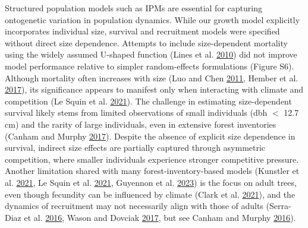 \documentclass[12pt]{article}
\begin{document}
Structured population models such as IPMs are essential for capturing
ontogenetic variation in population dynamics. While our growth model
explicitly incorporates individual size, survival and recruitment models
were specified without direct size dependence. Attempts to include
size-dependent mortality using the widely assumed U-shaped function
(Lines et al. \protect\hyperlink{ref-Lines2010}{2010}) did not improve
model performance relative to simpler random-effects formulations
(Figure S6). Although mortality often increases with size (Luo and Chen
\protect\hyperlink{ref-Luo2011}{2011}, Hember et al.
\protect\hyperlink{ref-Hember2017}{2017}), its significance appears to
manifest only when interacting with climate and competition (Le Squin et
al. \protect\hyperlink{ref-LeSquin2021}{2021}). The challenge in
estimating size-dependent survival likely stems from limited
observations of small individuals (dbh \(<\) 12.7 cm) and the rarity of
large individuals, even in extensive forest inventories (Canham and
Murphy \protect\hyperlink{ref-Canham2017}{2017}). Despite the absence of
explicit size dependence in survival, indirect size effects are
partially captured through asymmetric competition, where smaller
individuals experience stronger competitive pressure. Another limitation
shared with many forest-inventory-based models (Kunstler et al.
\protect\hyperlink{ref-Kunstler2021}{2021}, Le Squin et al.
\protect\hyperlink{ref-LeSquin2021}{2021}, Guyennon et al.
\protect\hyperlink{ref-Guyennon2023}{2023}) is the focus on adult trees,
even though fecundity can be influenced by climate (Clark et al.
\protect\hyperlink{ref-Clark2021}{2021}), and the dynamics of
recruitment may not necessarily align with those of adults (Serra-Diaz
et al. \protect\hyperlink{ref-SerraDiaz2016}{2016}, Wason and Dovciak
\protect\hyperlink{ref-Wason2017}{2017}, but see Canham and Murphy
\protect\hyperlink{ref-Canham2016}{2016}).
\end{document}
